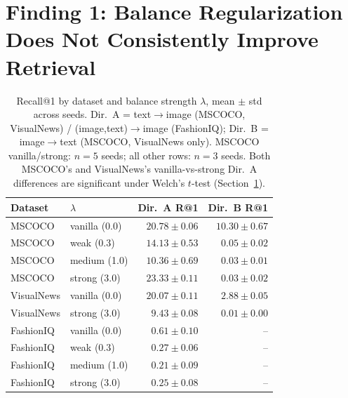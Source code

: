 \section{Finding 1: Balance Regularization Does Not Consistently Improve Retrieval}
\label{sec:finding1}

\begin{table}[t]
\centering
\caption{Recall@1 by dataset and balance strength $\lambda$, mean $\pm$ std across seeds. Dir.\ A = text$\to$image (MSCOCO, VisualNews) / (image,text)$\to$image (FashionIQ); Dir.\ B = image$\to$text (MSCOCO, VisualNews only). MSCOCO vanilla/strong: $n{=}5$ seeds; all other rows: $n{=}3$ seeds. Both MSCOCO's and VisualNews's vanilla-vs-strong Dir.\ A differences are significant under Welch's $t$-test (Section~\ref{sec:finding1}).}
\label{tab:main}
\footnotesize
\begin{tabular}{@{}llrr@{}}
\toprule
Dataset & $\lambda$ & Dir.\ A R@1 & Dir.\ B R@1 \\
\midrule
MSCOCO     & vanilla (0.0) & $20.78\pm0.06$ & $10.30\pm0.67$ \\
MSCOCO     & weak (0.3)    & $14.13\pm0.53$ & $0.05\pm0.02$ \\
MSCOCO     & medium (1.0)  & $10.36\pm0.69$ & $0.03\pm0.01$ \\
MSCOCO     & strong (3.0)  & $\mathbf{23.33\pm0.11}$ & $0.03\pm0.02$ \\
\midrule
VisualNews & vanilla (0.0) & $\mathbf{20.07\pm0.11}$ & $\mathbf{2.88\pm0.05}$ \\
VisualNews & strong (3.0)  & $9.43\pm0.08$  & $0.01\pm0.00$ \\
\midrule
FashionIQ  & vanilla (0.0) & $\mathbf{0.61\pm0.10}$ & -- \\
FashionIQ  & weak (0.3)    & $0.27\pm0.06$  & -- \\
FashionIQ  & medium (1.0)  & $0.21\pm0.09$  & -- \\
FashionIQ  & strong (3.0)  & $0.25\pm0.08$  & -- \\
\bottomrule
\end{tabular}
\end{table}

